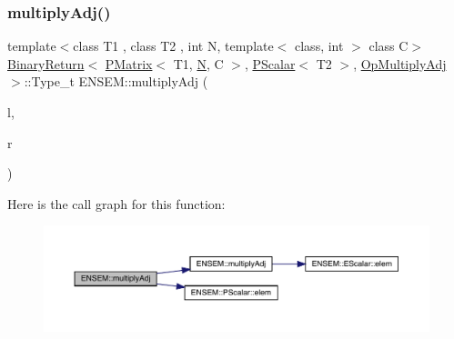 \subsubsection{\texorpdfstring{multiplyAdj()}{multiplyAdj()}\hspace{0.1cm}{\footnotesize\ttfamily [1/3]}}
{\footnotesize\ttfamily template$<$class T1 , class T2 , int N, template$<$ class, int $>$ class C$>$ \\
\mbox{\hyperlink{structENSEM_1_1BinaryReturn}{Binary\+Return}}$<$ \mbox{\hyperlink{classENSEM_1_1PMatrix}{P\+Matrix}}$<$ T1, \mbox{\hyperlink{operator__name__util_8cc_a7722c8ecbb62d99aee7ce68b1752f337}{N}}, C $>$, \mbox{\hyperlink{classENSEM_1_1PScalar}{P\+Scalar}}$<$ T2 $>$, \mbox{\hyperlink{structENSEM_1_1OpMultiplyAdj}{Op\+Multiply\+Adj}} $>$\+::Type\+\_\+t E\+N\+S\+E\+M\+::multiply\+Adj (\begin{DoxyParamCaption}\item[{const \mbox{\hyperlink{classENSEM_1_1PMatrix}{P\+Matrix}}$<$ T1, \mbox{\hyperlink{operator__name__util_8cc_a7722c8ecbb62d99aee7ce68b1752f337}{N}}, C $>$ \&}]{l,  }\item[{const \mbox{\hyperlink{classENSEM_1_1PScalar}{P\+Scalar}}$<$ T2 $>$ \&}]{r }\end{DoxyParamCaption})\hspace{0.3cm}{\ttfamily [inline]}}

Here is the call graph for this function\+:\nopagebreak
\begin{figure}[H]
\begin{center}
\leavevmode
\includegraphics[width=350pt]{df/d0a/group__primmatrix_ga1635949cdf21523d1c8bdb6d5ada65a8_cgraph}
\end{center}
\end{figure}
\mbox{\label{group__primmatrix_ga500e40c33d8e7e4a2a95970fb8a56326}} 
